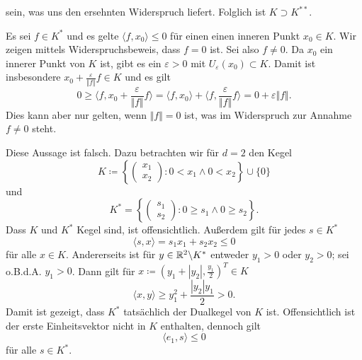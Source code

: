\begin{compactenum}[(i)]
\begin{compactenum}
 sein, was uns den ersehnten Widerspruch liefert. Folglich ist $K\supset K^{**}$.
 \\
 \end{compactenum}
 \item  Es sei $f\in K^*$ und es gelte $\langle f, x_0\rangle\leq 0$ für einen einen inneren Punkt $x_0\in K$.
 Wir zeigen mittels Widerspruchsbeweis, dass $f=0$ ist. Sei also $f\neq0$. Da $x_0$ ein innerer Punkt von $K$ 
 ist, gibt es ein $\varepsilon>0$ mit $U_\varepsilon(x_0)\subset K$. Damit ist insbesondere 
 $x_0+\frac{\varepsilon}{\Vert f \Vert} f\in K$ und es gilt
 \begin{displaymath}
  0\geq \langle f,x_0+\frac{\varepsilon}{\Vert f \Vert} f\rangle
  = \langle f,x_0\rangle+\langle f,\frac{\varepsilon}{\Vert f \Vert} f\rangle
  =0+\varepsilon \Vert f\Vert.
 \end{displaymath}
 Dies kann aber nur gelten, wenn $\Vert f\Vert=0$ ist, was im Widerspruch zur Annahme $f\neq 0$ steht.
 \\
 \item Diese Aussage ist falsch. Dazu betrachten wir für $d=2$ den Kegel
 \begin{displaymath}
  K\coloneqq\left\{\begin{pmatrix}x_1\\x_2\end{pmatrix}: 0< x_1 \land 0< x_2 \right\}\cup\{0\}
 \end{displaymath}
  und
  \begin{displaymath}
  K^*=\left\{\begin{pmatrix}s_1\\s_2\end{pmatrix}: 0\geq s_1 \land 0\geq s_2 \right\}.
 \end{displaymath}
 Dass $K$ und $K^*$ Kegel sind, ist offensichtlich. Außerdem gilt für jedes $s\in K^*$
 \begin{displaymath}
  \langle s,x\rangle =s_1x_1+s_2x_2\leq 0
 \end{displaymath}
 für alle $x\in K$. Andererseits ist für $y\in \mathbb{R}^2\backslash K^*$ entweder $y_1>0$ oder $y_2>0$;
 sei o.B.d.A. $y_1>0$. Dann gilt für $x\coloneqq(y_1+|y_2|,\frac{y_1}{2})^T\in K$
 \begin{displaymath}
  \langle x, y\rangle \geq y_1^2+\frac{|y_2|y_1}{2}>0.
 \end{displaymath}
 Damit ist gezeigt, dass $K^*$ tatsächlich der Dualkegel von $K$ ist. Offensichtlich ist der 
 erste Einheitsvektor nicht in $K$ enthalten, dennoch gilt
  \begin{displaymath}
  \langle e_1, s\rangle \leq 0
 \end{displaymath}
 für alle $s\in K^*$.
\end{compactenum}
